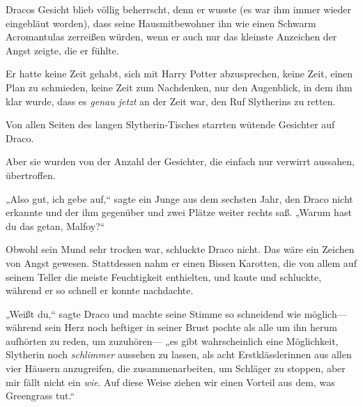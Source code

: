 Dracos Gesicht blieb völlig beherrscht, denn er wusste (es war ihm immer wieder eingebläut worden), dass seine Hausmitbewohner ihn wie einen Schwarm Acromantulas zerreißen würden, wenn er auch nur das kleinste Anzeichen der Angst zeigte, die er fühlte.

Er hatte keine Zeit gehabt, sich mit Harry Potter abzusprechen, keine Zeit, einen Plan zu schmieden, keine Zeit zum Nachdenken, nur den Augenblick, in dem ihm klar wurde, dass es \emph{genau jetzt} an der Zeit war, den Ruf Slytherins zu retten.

Von allen Seiten des langen Slytherin-Tisches starrten wütende Gesichter auf Draco.

Aber sie wurden von der Anzahl der Gesichter, die einfach nur verwirrt aussahen, übertroffen.

„Also gut, ich gebe auf,“ sagte ein Junge aus dem sechsten Jahr, den Draco nicht erkannte und der ihm gegenüber und zwei Plätze weiter rechts saß. „Warum hast du das getan, Malfoy?“

Obwohl sein Mund sehr trocken war, schluckte Draco nicht. Das wäre ein Zeichen von Angst gewesen. Stattdessen nahm er einen Bissen Karotten, die von allem auf seinem Teller die meiste Feuchtigkeit enthielten, und kaute und schluckte, während er so schnell er konnte nachdachte.

„Weißt du,“ sagte Draco und machte seine Stimme so schneidend wie möglich—während sein Herz noch heftiger in seiner Brust pochte als alle um ihn herum aufhörten zu reden, um zuzuhören— „es gibt wahrscheinlich eine Möglichkeit, Slytherin noch \emph{schlimmer} aussehen zu lassen, als acht Erstklässlerinnen aus allen vier Häusern anzugreifen, die zusammenarbeiten, um Schläger zu stoppen, aber mir fällt nicht ein \emph{wie}. Auf diese Weise ziehen wir einen Vorteil aus dem, was Greengrass tut.“

